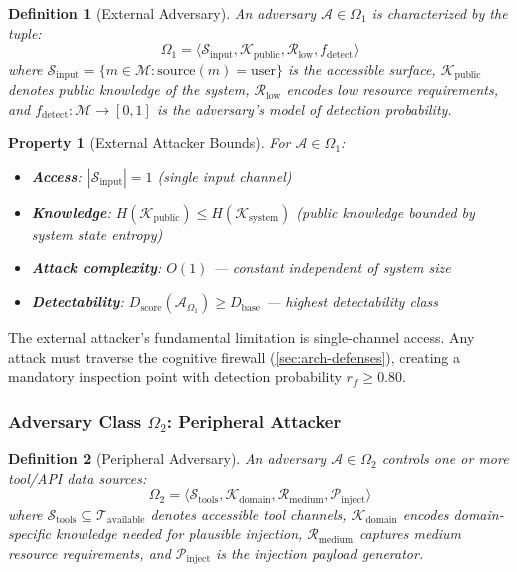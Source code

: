 \documentclass[
]{article}
\newtheorem{definition}{Definition}[section]
\newtheorem{property}{Property}[section]
\begin{document}
\begin{definition}[External Adversary]
\label{def:omega1}
An adversary $\mathcal{A} \in \Omega_1$ is characterized by the tuple:
\begin{equation}
\label{eq:omega1-formal}
\Omega_1 = \langle \mathcal{S}_{\text{input}}, \mathcal{K}_{\text{public}}, \mathcal{R}_{\text{low}}, f_{\text{detect}} \rangle
\end{equation}
where $\mathcal{S}_{\text{input}} = \{m \in \mathcal{M} : \text{source}(m) = \text{user}\}$ is the accessible surface, $\mathcal{K}_{\text{public}}$ denotes public knowledge of the system, $\mathcal{R}_{\text{low}}$ encodes low resource requirements, and $f_{\text{detect}}: \mathcal{M} \to [0,1]$ is the adversary's model of detection probability.
\end{definition}

\begin{property}[External Attacker Bounds]
\label{prop:omega1-bounds}
For $\mathcal{A} \in \Omega_1$:
\begin{itemize}
\item \textbf{Access}: $|\mathcal{S}_{\text{input}}| = 1$ (single input channel)
\item \textbf{Knowledge}: $H(\mathcal{K}_{\text{public}}) \leq H(\mathcal{K}_{\text{system}})$ (public knowledge bounded by system state entropy)
\item \textbf{Attack complexity}: $O(1)$ --- constant independent of system size
\item \textbf{Detectability}: $D_{\text{score}}(\mathcal{A}_{\Omega_1}) \geq D_{\text{base}}$ --- highest detectability class
\end{itemize}
\end{property}

The external attacker's fundamental limitation is single-channel access.
Any attack must traverse the cognitive firewall
(\cref{sec:arch-defenses}), creating a mandatory inspection point with
detection probability \(r_f \geq 0.80\).

\subsubsection{\texorpdfstring{Adversary Class \(\Omega_2\): Peripheral
Attacker}{Adversary Class Omega_2: Peripheral Attacker}}\label{adversary-class-omega_2-peripheral-attacker}

\begin{definition}[Peripheral Adversary]
\label{def:omega2}
An adversary $\mathcal{A} \in \Omega_2$ controls one or more tool/API data sources:
\begin{equation}
\label{eq:omega2-formal}
\Omega_2 = \langle \mathcal{S}_{\text{tools}}, \mathcal{K}_{\text{domain}}, \mathcal{R}_{\text{medium}}, \mathcal{P}_{\text{inject}} \rangle
\end{equation}
where $\mathcal{S}_{\text{tools}} \subseteq \mathcal{T}_{\text{available}}$ denotes accessible tool channels, $\mathcal{K}_{\text{domain}}$ encodes domain-specific knowledge needed for plausible injection, $\mathcal{R}_{\text{medium}}$ captures medium resource requirements, and $\mathcal{P}_{\text{inject}}$ is the injection payload generator.
\end{definition}
\end{document}
